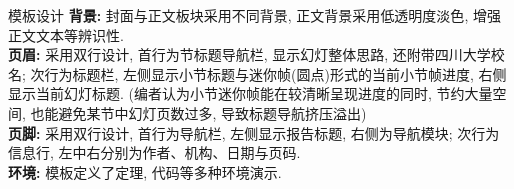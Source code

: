 \documentclass[hyperref,UTF8,11pt]{beamer}
\begin{document}
\begin{frame}{模板设计}
	\textbf{背景:} 封面与正文板块采用{\color{JXred}不同背景}, 正文背景采用{\color{JXred}低透明度淡色}, 增强正文文本等辨识性.\\[1ex]
	\textbf{页眉:} 采用双行设计, 首行为{\color{JXred}节标题导航栏}, 显示幻灯整体思路, 还附带四川大学校名; 次行为标题栏, 左侧显示{\color{JXred}小节标题}与{\color{JXred}迷你帧(圆点)形式的当前小节帧进度}, 右侧显示当前{\color{JXred}幻灯标题}. (编者认为小节迷你帧能在较清晰呈现进度的同时, 节约大量空间, 也能避免某节中幻灯页数过多, 导致标题导航挤压溢出)\\[1ex]
	\textbf{页脚:} 采用双行设计, 首行为导航栏, 左侧显示{\color{JXred}报告标题}, 右侧为{\color{JXred}导航模块}; 次行为信息行, 左中右分别为{\color{JXred}作者}、{\color{JXred}机构}、{\color{JXred}日期与页码}.\\[1ex]
	\textbf{环境:} 模板定义了{\color{JXred}定理}, {\color{JXred}代码}等多种环境演示.
\end{frame}
\end{document}
